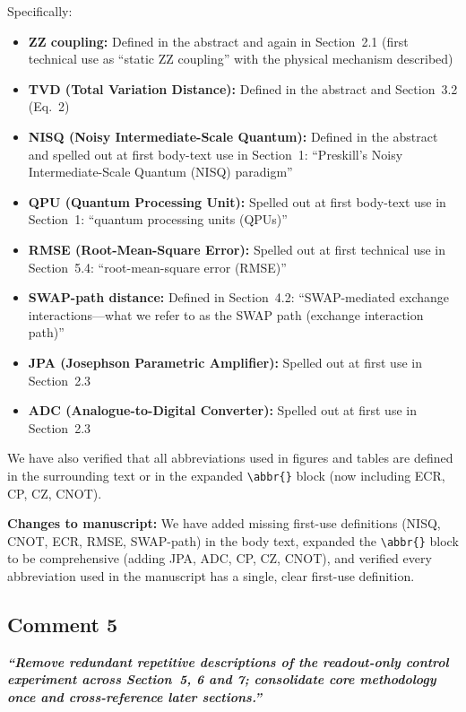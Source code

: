 \documentclass[11pt,a4paper]{article}
\begin{document}
Specifically:
\begin{itemize}[leftmargin=*]
    \item \textbf{ZZ coupling:} Defined in the abstract and again in Section~2.1 (first
    technical use as ``static ZZ coupling'' with the physical mechanism described)
    \item \textbf{TVD (Total Variation Distance):} Defined in the abstract and
    Section~3.2 (Eq.~2)
    \item \textbf{NISQ (Noisy Intermediate-Scale Quantum):} Defined in the abstract and
    spelled out at first body-text use in Section~1: ``Preskill's Noisy Intermediate-Scale
    Quantum (NISQ) paradigm''
    \item \textbf{QPU (Quantum Processing Unit):} Spelled out at first body-text use in
    Section~1: ``quantum processing units (QPUs)''
    \item \textbf{RMSE (Root-Mean-Square Error):} Spelled out at first technical use in
    Section~5.4: ``root-mean-square error (RMSE)''
    \item \textbf{SWAP-path distance:} Defined in Section~4.2: ``SWAP-mediated exchange
    interactions---what we refer to as the SWAP path (exchange interaction path)''
    \item \textbf{JPA (Josephson Parametric Amplifier):} Spelled out at first use in
    Section~2.3
    \item \textbf{ADC (Analogue-to-Digital Converter):} Spelled out at first use in
    Section~2.3
\end{itemize}

We have also verified that all abbreviations used in figures and tables are defined in the
surrounding text or in the expanded \verb|\abbr{}| block (now including ECR, CP, CZ, CNOT).

\medskip\noindent\textbf{Changes to manuscript:} We have added missing first-use
definitions (NISQ, CNOT, ECR, RMSE, SWAP-path) in the body text, expanded the
\verb|\abbr{}| block to be comprehensive (adding JPA, ADC, CP, CZ, CNOT), and verified
every abbreviation used in the manuscript has a single, clear first-use definition.

\subsection*{Comment 5}

\noindent\textbf{\textit{``Remove redundant repetitive descriptions of the readout-only
control experiment across Section~5, 6 and 7; consolidate core methodology once and
cross-reference later sections.''}}
\end{document}
